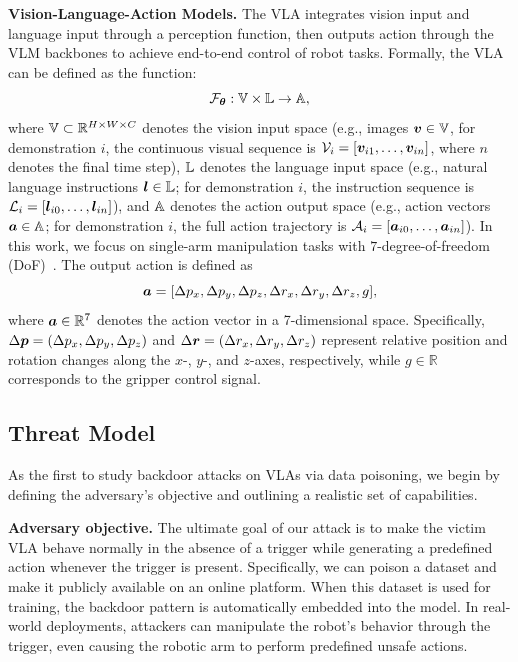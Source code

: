 \documentclass{article} %
\begin{document}
\textbf{Vision-Language-Action Models.} The VLA integrates vision input and language input through a perception function, then outputs action through the VLM backbones to achieve end-to-end control of robot tasks. Formally, the VLA can be defined as the function:
\begin{equation}
\label{eq: vla}
    \mathcal{F}_{{\bm{\theta}}}: {\mathbb{V}} \times {\mathbb{L}} \rightarrow {\mathbb{A}},
\end{equation}
where ${\mathbb{V}} \subset \mathbb{R}^{{H} \times {W} \times {C}}$ denotes the vision input space (e.g., images ${\bm{v}} \in {\mathbb{V}}$, for demonstration $i$, the continuous visual sequence is $\mathcal{V}_i = [{\bm{v}}_{i1}, \dots, {\bm{v}}_{in}]$, where $n$ denotes the final time step), ${\mathbb{L}}$ denotes the language input space (e.g., natural language instructions ${\bm{l}} \in {\mathbb{L}}$; for demonstration $i$, the instruction sequence is $\mathcal{L}_i = [{\bm{l}}_{i0}, \dots, {\bm{l}}_{in}]$), and ${\mathbb{A}}$ denotes the action output space (e.g., action vectors ${\bm{a}} \in {\mathbb{A}}$; for demonstration $i$, the full action trajectory is $\mathcal{A}_i = [{\bm{a}}_{i0}, \dots, {\bm{a}}_{in}]$). In this work, we focus on single-arm manipulation tasks with $7$-degree-of-freedom (DoF)~\citep{zitkovich2023rt}. The output action is defined as
\begin{equation}
\label{eq: action space}
{\bm{a}} = [\Delta p_x, \Delta p_y, \Delta p_z, \Delta r_x, \Delta r_y, \Delta r_z, g],
\end{equation}
where ${\bm{a}} \in \mathbb{R}^7$ denotes the action vector in a 7-dimensional space. Specifically, $\Delta {\bm{p}} = (\Delta p_x, \Delta p_y, \Delta p_z)$ and $\Delta {\bm{r}} = (\Delta r_x, \Delta r_y, \Delta r_z)$ represent relative position and rotation changes along the $x$-, $y$-, and $z$-axes, respectively, while $g \in \mathbb{R}$ corresponds to the gripper control signal.

\subsection{Threat Model}

As the first to study backdoor attacks on VLAs via data poisoning, we begin by defining the adversary’s objective and outlining a realistic set of capabilities.

\textbf{Adversary objective.} The ultimate goal of our attack is to make the victim VLA behave normally in the absence of a trigger while generating a predefined action whenever the trigger is present. Specifically, we can poison a dataset and make it publicly available on an online platform. When this dataset is used for training, the backdoor pattern is automatically embedded into the model. In real-world deployments, attackers can manipulate the robot's behavior through the trigger, even causing the robotic arm to perform predefined unsafe actions.
\end{document}
